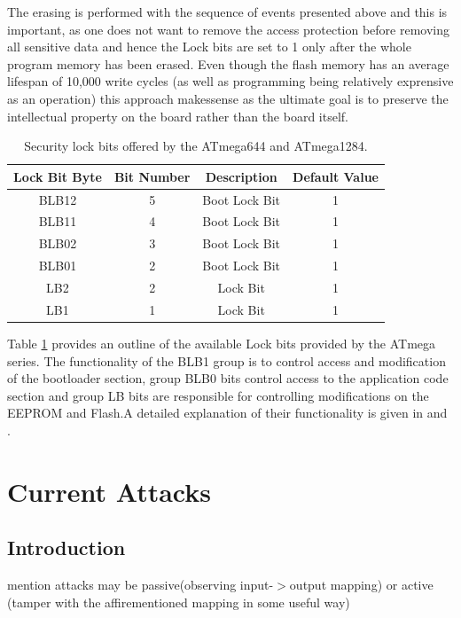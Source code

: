 \documentclass[12pt,a4paper,twocolumn]{article}
\begin{document}
	The erasing is performed with the sequence of events presented above and this is important, as one does not want to remove the access protection before removing all sensitive data and hence the Lock bits are set to 1 only after the whole program memory has been erased. Even though the flash memory has an average lifespan of 10,000 write cycles (as well as programming being relatively exprensive as an operation) this approach makessense as the ultimate goal is to preserve the intellectual property on the board rather than the board itself.
	
	\begin{table}
		\center
		\begin{tabular}{| c | c | c | c |}
			\hline
			\textbf{Lock Bit Byte} & \textbf{Bit Number} & \textbf{Description} & \textbf{Default Value}\\
			\hline \hline
			BLB12 & 5 & Boot Lock Bit & 1\\
			BLB11 & 4 & Boot Lock Bit & 1\\
			BLB02 & 3 & Boot Lock Bit & 1\\
			BLB01 & 2 & Boot Lock Bit & 1\\
			LB2 & 2 & Lock Bit & 1 \\
			LB1 & 1 & Lock Bit & 1 \\
			\hline
		\end{tabular}
		\caption{Security lock bits offered by the ATmega644 and ATmega1284.}
		\label{table:lock_bits}
	\end{table}
	
Table \ref{table:lock_bits}	 provides an outline of the available Lock bits provided by the ATmega series. The functionality of the BLB1 group is to control access and modification of the bootloader section, group BLB0 bits control access to the application code section and group LB bits are responsible for controlling modifications on the EEPROM and Flash.A detailed explanation of their functionality is given in \citep{atmega1284_manual} and \citep{atmega644_manual}.
	
	\section{Current Attacks}
	\subsection{Introduction}
	mention attacks may be passive(observing input-$>$output mapping) or active (tamper with the affirementioned mapping in some useful way)
\end{document}
